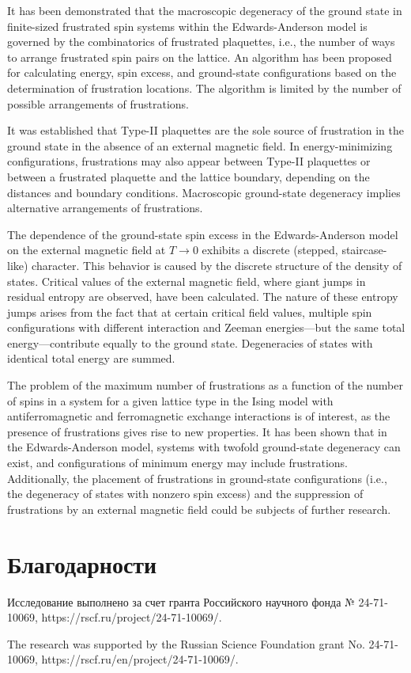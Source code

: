 \documentclass[utf8, babel, sor, jor, amsmath, amssymb, reprint]{elsarticle} %
\begin{document}
It has been demonstrated that the macroscopic degeneracy of the ground state in finite-sized frustrated spin systems within the Edwards-Anderson model is governed by the combinatorics of frustrated plaquettes, i.e., the number of ways to arrange frustrated spin pairs on the lattice. An algorithm has been proposed for calculating energy, spin excess, and ground-state configurations based on the determination of frustration locations. The algorithm is limited by the number of possible arrangements of frustrations.

It was established that Type-II plaquettes are the sole source of frustration in the ground state in the absence of an external magnetic field. In energy-minimizing configurations, frustrations may also appear between Type-II plaquettes or between a frustrated plaquette and the lattice boundary, depending on the distances and boundary conditions. Macroscopic ground-state degeneracy implies alternative arrangements of frustrations.

The dependence of the ground-state spin excess in the Edwards-Anderson model on the external magnetic field at $T \to 0$ exhibits a discrete (stepped, staircase-like) character. This behavior is caused by the discrete structure of the density of states. Critical values of the external magnetic field, where giant jumps in residual entropy are observed, have been calculated. The nature of these entropy jumps arises from the fact that at certain critical field values, multiple spin configurations with different interaction and Zeeman energies—but the same total energy—contribute equally to the ground state. Degeneracies of states with identical total energy are summed.

The problem of the maximum number of frustrations as a function of the number of spins in a system for a given lattice type in the Ising model with antiferromagnetic and ferromagnetic exchange interactions is of interest, as the presence of frustrations gives rise to new properties. It has been shown that in the Edwards-Anderson model, systems with twofold ground-state degeneracy can exist, and configurations of minimum energy may include frustrations. Additionally, the placement of frustrations in ground-state configurations (i.e., the degeneracy of states with nonzero spin excess) and the suppression of frustrations by an external magnetic field could be subjects of further research.


\section{Благодарности}

Исследование выполнено за счет гранта Российского научного фонда № 24-71-10069, https://rscf.ru/project/24-71-10069/.

The research was supported by the Russian Science Foundation grant No. 24-71-10069, https://rscf.ru/en/project/24-71-10069/.


\end{document}
